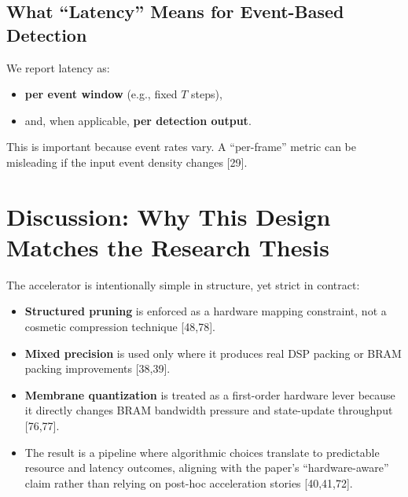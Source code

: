 \documentclass[10pt,journal,compsoc]{IEEEtran}
\begin{document}
\subsection{What ``Latency'' Means for Event-Based Detection}
We report latency as:
\begin{itemize}
    \item \textbf{per event window} (e.g., fixed $T$ steps),
    \item and, when applicable, \textbf{per detection output}.
\end{itemize}
This is important because event rates vary. A ``per-frame'' metric can be misleading if the input event density changes [29].

\section{Discussion: Why This Design Matches the Research Thesis}
The accelerator is intentionally simple in structure, yet strict in contract:
\begin{itemize}
    \item \textbf{Structured pruning} is enforced as a hardware mapping constraint, not a cosmetic compression technique [48,78].
    \item \textbf{Mixed precision} is used only where it produces real DSP packing or BRAM packing improvements [38,39].
    \item \textbf{Membrane quantization} is treated as a first-order hardware lever because it directly changes BRAM bandwidth pressure and state-update throughput [76,77].
    \item The result is a pipeline where algorithmic choices translate to predictable resource and latency outcomes, aligning with the paper's ``hardware-aware'' claim rather than relying on post-hoc acceleration stories [40,41,72].
\end{itemize}
\end{document}
